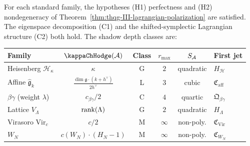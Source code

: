 \begin{theorem}
For each standard family, the hypotheses
\textup{(H1)} perfectness and \textup{(H2)} nondegeneracy
of Theorem~\textup{\ref{thm:thqg-III-lagrangian-polarization}}
are satisfied. The eigenspace decomposition \textup{(C1)} and
the shifted-symplectic Lagrangian structure \textup{(C2)} both
hold. The shadow depth classes are:

\begin{center}
\renewcommand{\arraystretch}{1.3}
\begin{tabular}{l@{\;\;}c@{\;\;}c@{\;\;}c@{\;\;}c@{\;\;}l}
\textbf{Family} & $\kappaChHodge(\cA)$ & \textbf{Class}
& $r_{\max}$ & $S_{\mathcal{A}}$ & \textbf{First jet} \\
\midrule
Heisenberg $\mathcal{H}_\kappa$
& $\kappa$ & G & $2$ & quadratic & $H_{\mathcal{H}}$
\\
Affine $\widehat{\mathfrak{g}}_k$
& $\frac{\dim\mathfrak{g}\cdot(k+h^\vee)}{2h^\vee}$ & L & $3$ & cubic
& $\mathfrak{C}_{\mathrm{aff}}$
\\
$\beta\gamma$ (weight $\lambda$)
& $c_{\beta\gamma}/2$ & C & $4$ & quartic & $\mathfrak{Q}_{\beta\gamma}$
\\
Lattice $V_\Lambda$
& $\operatorname{rank}(\Lambda)$ & G & $2$ & quadratic & $H_\Lambda$
\\
Virasoro $\mathrm{Vir}_c$
& $c/2$ & M & $\infty$ & non-poly.
& $\mathfrak{C}_{\mathrm{Vir}}$
\\
$W_N$
& $c(W_N) \cdot (H_N - 1)$ & M & $\infty$ & non-poly.
& $\mathfrak{C}_{W_N}$
\\
\end{tabular}
\end{center}
\end{theorem}

